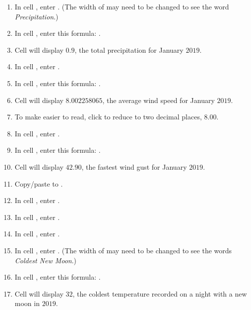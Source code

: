 \begin{enumbox}
\begin{enumerate}
		\item In cell , enter .  (The width of  may need to be changed to see the word \textit{Precipitation}.)
		\item In cell , enter this formula: .
		\item Cell  will display $ 0.9 $, the total precipitation for January $ 2019 $.
	
		\item In cell , enter .
		\item In cell , enter this formula: .
		\item Cell  will display $ 8.002258065 $, the average wind speed for January $ 2019 $.
		\item To make  easier to read, click  to reduce  to two decimal places, $ 8.00 $.
	
		\item In cell , enter .
		\item In cell , enter this formula: .
		\item Cell  will display $ 42.90 $, the fastest wind gust for January $ 2019 $.
	
		\item Copy/paste  to .
		\item In cell , enter .
		\item In cell , enter .
		\item In cell , enter .
		\item In cell , enter . (The width of  may need to be changed to see the words \textit{Coldest New Moon}.)
		\item In cell , enter this formula: .
		\item Cell  will display $ 32 $, the coldest temperature recorded on a night with a new moon in $ 2019 $.
	

\end{enumerate}
\end{enumbox}
